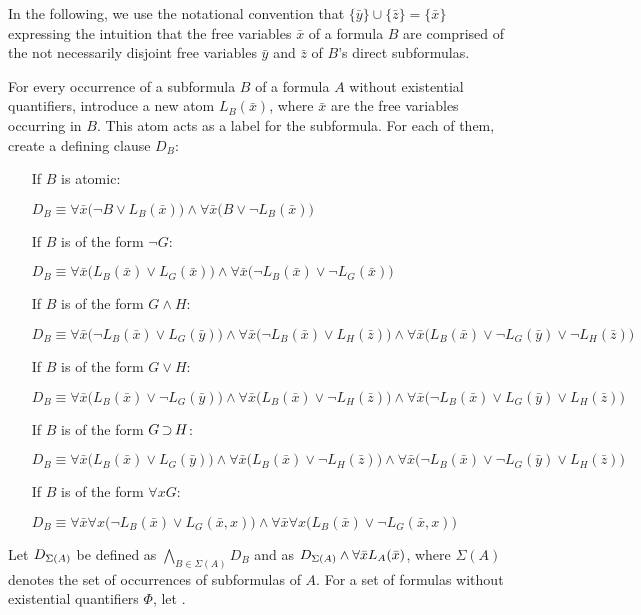 In the following, we use the notational convention that $\{\bar y\} \cup \{\bar z\} = \{\bar x\}$ expressing the intuition that the free variables $\bar x$ of a formula $B$ are comprised of the not necessarily disjoint free variables  $\bar y$ and $\bar z$ of $B$'s direct subformulas.

\begin{defi}
	For every occurrence of a subformula $B$ of a formula $A$ without existential quantifiers, introduce a new atom $L_B(\bar x)$, where $\bar x$ are the free variables occurring in $B$.
	This atom acts as a label for the subformula. 
For each of them, create a defining clause $D_B$:

\begin{itemize}
	\item[If $B$ is atomic:]~

		$D_B\equiv \forall \bar x \big(\lnot B \lor L_B(\bar x)\big) \land \forall \bar x \big(B \lor \lnot L_B(\bar x)\big)  $
	\item[If $B$ is of the form $\lnot G$:]~

		$D_B\equiv \forall \bar x \big(L_B(\bar x) \lor L_G(\bar x)\big) \land \forall \bar x \big(\lnot L_B(\bar x) \lor \lnot L_G(\bar x)\big)$
	\item[If $B$ is of the form $G \land H$:]~

		$D_B\equiv \forall \bar x \big(\lnot L_B(\bar x) \lor L_G(\bar y)\big) \land \forall \bar x \big(\lnot L_B(\bar x) \lor L_H(\bar z)\big) \land \forall \bar x \big(L_B(\bar x) \lor \lnot L_G(\bar y) \lor \lnot L_H(\bar z)\big)  $
	\item[If $B$ is of the form $G \lor H$:]~

		$D_B\equiv \forall \bar x \big(L_B(\bar x) \lor \lnot L_G(\bar y)\big) \land \forall \bar x \big(L_B(\bar x) \lor \lnot L_H(\bar z)\big) \land \forall \bar x \big(\lnot L_B(\bar x) \lor L_G(\bar y) \lor L_H(\bar z)\big)$
	\item[If $B$ is of the form $G \operatorname{\supset} H$:]~

		$D_B\equiv \forall \bar x \big(L_B(\bar x) \lor L_G(\bar y)\big) \land
		\forall \bar x \big(L_B(\bar x) \lor \lnot L_H(\bar z)\big) \land \forall \bar x \big(\lnot L_B(\bar x) \lor \lnot L_G(\bar y) \lor L_H(\bar z)\big)  $
	\item[If $B$ is of the form $\forall x G$:]~

		$D_B\equiv \forall \bar x \forall x \big(\lnot L_B(\bar x) \lor L_G(\bar x, x)\big) \land \forall \bar x \forall x \big(L_B(\bar x) \lor \lnot L_G(\bar x, x)\big)$
\end{itemize}

Let $D_{\Sigma(A)}$ be defined as $\bigwedge_{B \in \Sigma(A)} D_B$ and
 as $D_{\Sigma(A)} \land \forall \bar x L_A(\bar x)$, where $\Sigma(A)$ denotes the set of occurrences of subformulas of $A$.
For a set of formulas without existential quantifiers $\Phi$, let .
\end{defi}

